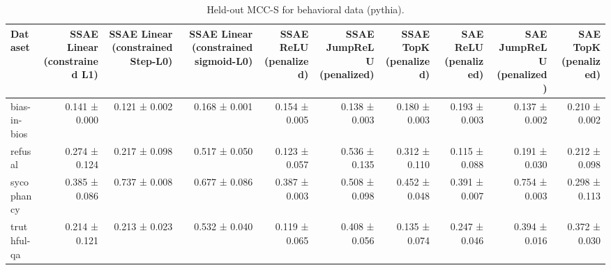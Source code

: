 \begin{table}[t]
\centering
\caption{Held-out MCC-S for behavioral data (pythia).}
\label{tab:behavioral-pythia-mcc-s}
\begin{tabular}{lrrrrrrrrr}
\toprule
Dataset & SSAE Linear (constrained L1) & SSAE Linear (constrained Step-L0) & SSAE Linear (constrained sigmoid-L0) & SSAE ReLU (penalized) & SSAE JumpReLU (penalized) & SSAE TopK (penalized) & SAE ReLU (penalized) & SAE JumpReLU (penalized) & SAE TopK (penalized) \\
\midrule
bias-in-bios & 0.141 ± 0.000 & 0.121 ± 0.002 & 0.168 ± 0.001 & 0.154 ± 0.005 & 0.138 ± 0.003 & 0.180 ± 0.003 & 0.193 ± 0.003 & 0.137 ± 0.002 & 0.210 ± 0.002 \\
refusal & 0.274 ± 0.124 & 0.217 ± 0.098 & 0.517 ± 0.050 & 0.123 ± 0.057 & 0.536 ± 0.135 & 0.312 ± 0.110 & 0.115 ± 0.088 & 0.191 ± 0.030 & 0.212 ± 0.098 \\
sycophancy & 0.385 ± 0.086 & 0.737 ± 0.008 & 0.677 ± 0.086 & 0.387 ± 0.003 & 0.508 ± 0.098 & 0.452 ± 0.048 & 0.391 ± 0.007 & 0.754 ± 0.003 & 0.298 ± 0.113 \\
truthful-qa & 0.214 ± 0.121 & 0.213 ± 0.023 & 0.532 ± 0.040 & 0.119 ± 0.065 & 0.408 ± 0.056 & 0.135 ± 0.074 & 0.247 ± 0.046 & 0.394 ± 0.016 & 0.372 ± 0.030 \\
\bottomrule
\end{tabular}
\end{table}

